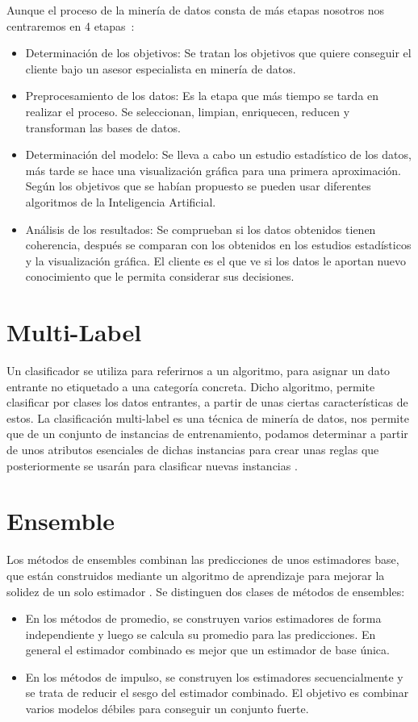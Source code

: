 Aunque el proceso de la minería de datos consta de más etapas nosotros nos centraremos en 4 etapas~\cite{datamining}:
\begin{itemize}
	\item Determinación de los objetivos: Se tratan los objetivos que quiere conseguir el cliente bajo un asesor especialista en minería de datos.
	\item Preprocesamiento de los datos: Es la etapa que más tiempo se tarda en realizar el proceso. Se seleccionan, limpian, enriquecen, reducen y transforman las bases de datos.
	\item Determinación del modelo: Se lleva a cabo un estudio estadístico de los datos, más tarde se hace una visualización gráfica para una primera aproximación. Según los objetivos que se habían propuesto se pueden usar diferentes algoritmos de la Inteligencia Artificial.
	\item  Análisis de los resultados: Se comprueban si los datos obtenidos tienen coherencia, después se comparan con los obtenidos en los estudios estadísticos y la visualización gráfica. El cliente es el que ve si los datos le aportan nuevo conocimiento que le permita considerar sus decisiones.
\end{itemize}

\section{Multi-Label}
Un clasificador se utiliza para referirnos a un algoritmo, para asignar un dato entrante no etiquetado a una categoría concreta. Dicho algoritmo, permite clasificar por clases los datos entrantes, a partir de unas ciertas características de estos.
La clasificación multi-label es una técnica de minería de datos, nos permite que de un conjunto de instancias de entrenamiento, podamos determinar a partir de unos atributos esenciales de dichas instancias para crear unas reglas que posteriormente se usarán para clasificar nuevas instancias \cite{multilabel}.    

\section{Ensemble}
Los métodos de ensembles combinan las predicciones de unos estimadores base, que están construidos mediante un algoritmo de aprendizaje para mejorar la solidez de un solo estimador \cite{ensemble}.
Se distinguen dos clases de métodos de ensembles:
	\begin{itemize}
		\item En los métodos de promedio, se construyen varios estimadores de forma independiente y luego se calcula su promedio para las predicciones. En general el estimador combinado es mejor que un estimador de base única.
		\item En los métodos de impulso, se construyen los estimadores secuencialmente y se trata de reducir el sesgo del estimador combinado. El objetivo es combinar varios modelos débiles para conseguir un conjunto fuerte.
	\end{itemize}

